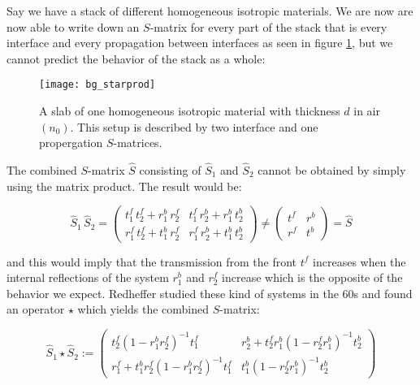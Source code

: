 Say we have a stack of different homogeneous isotropic materials. We are now are now able to write down an $S$-matrix for every part of the stack that is every interface and every propagation between interfaces as seen in figure \ref{fig:bg:star_prod}, but we cannot predict the behavior of the stack as a whole:

\begin{figure}[H]
    \centering
    \texttt{[image: bg\_starprod]}
    \caption{A slab of one homogeneous isotropic material with thickness $d$ in air $(n_0)$. This setup is described by two interface and one propergation $S$-matrices.}
    \label{fig:bg:star_prod}
\end{figure}



The combined $S$-matrix $\hat S$ consisting of $\hat S_1$ and $\hat S_2$ cannot be obtained by simply using the matrix product. The result would be:

\begin{equation}
    \hat S_1 \, \hat S_2 =
    \begin{pmatrix}
        t^f_1 \, t^f_2 + r^b_1 \, r^f_2 & t^f_1 \, r^b_2 + r^b_1 \, t^b_2 \\
        r^f_1 \, t^f_2 + t^b_1 \, r^f_2 & r^f_1 \, r^b_2 + t^b_1 \, t^b_2
    \end{pmatrix} \neq
    \begin{pmatrix}
        t^f & r^b \\
        r^f & t^b
    \end{pmatrix} =
    \hat S
\end{equation}

and this would imply that the transmission from the front $t^f$ increases when the internal reflections of the system $r^b_1$ and $r^f_2$ increase which is the opposite of the behavior we expect. Redheffer \cite{Redheffer1960} studied these kind of systems in the 60s and found an operator $\star$ which yields the combined $S$-matrix:

\begin{equation}\label{eq:bg:star}
    \hat S_1 \star \hat S_2 :=
    \begin{pmatrix}
        t^f_2 (1 - r^b_1 r^f_2)^{-1} t^f_1 &
        r^b_2 + t^f_2 r^b_1 (1 - r^f_2 r^b_1)^{-1} t^b_2\\
        r^f_1 + t^b_1 r^f_2 (1 - r^b_1 r^f_2)^{-1} t^f_1 &
        t^b_1 (1 - r^f_2 r^b_1)^{-1} t^b_2
    \end{pmatrix}
\end{equation}

